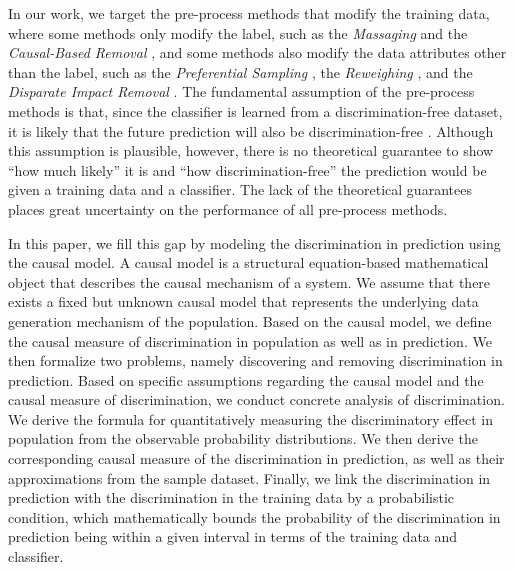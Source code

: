 \documentclass{article}
\begin{document}
In our work, we target the pre-process methods that modify the training data, where some methods only modify the label, such as the \emph{Massaging} \cite{kamiran2009classifying,zliobaite2011handling} and the \emph{Causal-Based Removal} \cite{zhang2017causal}, and some methods also modify the data attributes other than the label, such as the \emph{Preferential Sampling} \cite{kamiran2012data,zliobaite2011handling}, the \emph{Reweighing} \cite{calders2009building}, and the \emph{Disparate Impact Removal} \cite{feldman2015certifying,adler2016auditing}. 
The fundamental assumption of the pre-process methods is that, since the classifier is learned from a discrimination-free dataset, it is likely that the future prediction will also be discrimination-free \cite{kamiran2009discrimination}. 
Although this assumption is plausible, however, there is no theoretical guarantee to show ``how much likely'' it is and ``how discrimination-free'' the prediction would be given a training data and a classifier. The lack of the theoretical guarantees places great uncertainty on the performance of all pre-process methods.

In this paper, we fill this gap by modeling the discrimination in prediction using the causal model. A causal model \cite{pearl2009causality} is a structural equation-based mathematical object that describes the causal mechanism of a system.  We assume that there exists a fixed but unknown causal model that represents the underlying data generation mechanism of the population. Based on the causal model, we define the causal measure of discrimination in population as well as in prediction. We then formalize two problems, namely discovering and removing discrimination in prediction. Based on specific assumptions regarding the causal model and the causal measure of discrimination, we conduct concrete analysis of discrimination. We derive the formula for quantitatively measuring the discriminatory effect in population from the observable probability distributions. We then derive the corresponding causal measure of the discrimination in prediction, as well as their approximations from the sample dataset. Finally, we link the discrimination in prediction with the discrimination in the training data by a probabilistic condition, which mathematically bounds the probability of the discrimination in prediction being within a given interval in terms of the training data and classifier.
\end{document}
